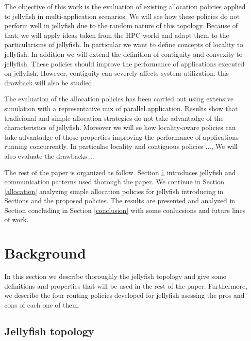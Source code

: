 \documentclass{sig-alternate}
\begin{document}
The objective of this work is the evaluation of existing allocation policies applied to jellyfish in multi-application scenarios. We will see how these policies do not perform well in jellyfish due to the random nature of this topology. Because of that, we will apply ideas taken from the HPC world and adapt them to the particularisms of jellyfish. In particular we want to define concepts of locality to jellyfish. In addition we will extend the definition of contiguity and convexity to jellyfish. These policies should improve the performance of applications executed on jellyfish. However, contiguity can severely affects system utilization. this drawback will also be studied.

The evaluation of the allocation policies has been carried out using extensive simulation with a representative mix of parallel application. Results show that tradicional and simple allocation strategies do not take advantadge of the characteristics of jellyfish. Moreover we will se how locality-aware policies can take advantadge of those properties improving the performance of applications running concurrently. In particulae locality and contiguous policies ..., We will also evaluate the drawbacks.... 

The rest of the paper is organized as follow. Section \ref{background} introduces jellyfish and communication patterns used thorough the paper. We continue in Section \ref{allocation} analyzing simple allocation policies for jellyfish introducing in Sections \cite{locality} and \cite{contiguity} the proposed policies. The results are presented and analyzed in Section \cite{results} concluding in Section \ref{conclusion} with some conlucsions and future lines of work.

\section{Background}
\label{background}

In this section we describe thoroughly the jellyfish topology and give some definitions and properties that will be used in the rest of the paper. Furthermore, we describe the four routing policies developed for jellyfish asessing the pros and cons of each one of them.

\subsection{Jellyfish topology}
\label{subsec:jellyfish}
\end{document}

